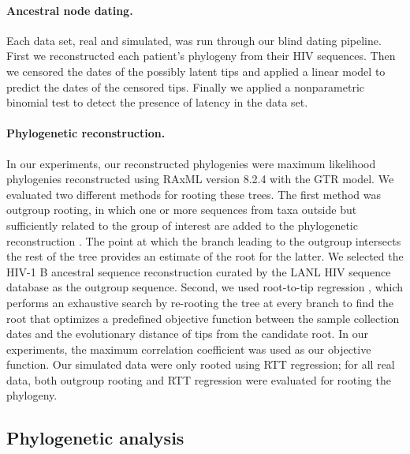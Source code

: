 \documentclass[12pt]{article}
\begin{document}
\paragraph {Ancestral node dating.}
Each data set, real and simulated, was run through our blind dating pipeline.
First we reconstructed each patient's phylogeny from their HIV sequences.
Then we censored the dates of the possibly latent tips and applied a linear model to predict the dates of the censored tips.
Finally we applied a nonparametric binomial test to detect the presence of latency in the data set.

\paragraph {Phylogenetic reconstruction.} \label{subsec:phylo}
In our experiments, our reconstructed phylogenies were maximum likelihood phylogenies reconstructed using RAxML version 8.2.4 \citep{Raxml14} with the GTR model.
We evaluated two different methods for rooting these trees. 
The first method was outgroup rooting, in which one or more sequences from taxa outside but sufficiently related to the group of interest are added to the phylogenetic reconstruction \citep{Huelsenbeck02}.
The point at which the branch leading to the outgroup intersects the rest of the tree provides an estimate of the root for the latter.
We selected the HIV-1 B ancestral sequence reconstruction curated by the LANL HIV sequence database as the outgroup sequence.
Second, we used root-to-tip regression \citep[RTT;][]{Korber00}, which performs an exhaustive search by re-rooting the tree at every branch to find the root that optimizes a predefined objective function between the sample collection dates and the evolutionary distance of tips from the candidate root.
In our experiments, the maximum correlation coefficient was used as our objective function.
Our simulated data were only rooted using RTT regression; for all real data, both outgroup rooting and RTT regression were evaluated for rooting the phylogeny.


\subsection * {Phylogenetic analysis}
\end{document}
